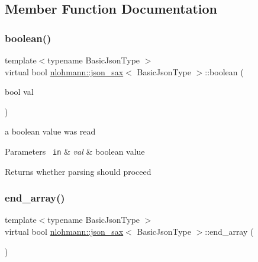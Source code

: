 \subsection{Member Function Documentation}
\mbox{\label{structnlohmann_1_1json__sax_a82ed080814fa656191a537284bb0c575}} 
\subsubsection{\texorpdfstring{boolean()}{boolean()}}
{\footnotesize\ttfamily template$<$typename Basic\+Json\+Type $>$ \\
virtual bool \mbox{\hyperlink{structnlohmann_1_1json__sax}{nlohmann\+::json\+\_\+sax}}$<$ Basic\+Json\+Type $>$\+::boolean (\begin{DoxyParamCaption}\item[{bool}]{val }\end{DoxyParamCaption})\hspace{0.3cm}{\ttfamily [pure virtual]}}



a boolean value was read 


\begin{DoxyParams}[1]{Parameters}
\mbox{\texttt{ in}}  & {\em val} & boolean value \\
\hline
\end{DoxyParams}
\begin{DoxyReturn}{Returns}
whether parsing should proceed 
\end{DoxyReturn}
\mbox{\label{structnlohmann_1_1json__sax_a235ee975617f28e6a996d1e36a282312}} 
\subsubsection{\texorpdfstring{end\_array()}{end\_array()}}
{\footnotesize\ttfamily template$<$typename Basic\+Json\+Type $>$ \\
virtual bool \mbox{\hyperlink{structnlohmann_1_1json__sax}{nlohmann\+::json\+\_\+sax}}$<$ Basic\+Json\+Type $>$\+::end\+\_\+array (\begin{DoxyParamCaption}{ }\end{DoxyParamCaption})\hspace{0.3cm}{\ttfamily [pure virtual]}}



